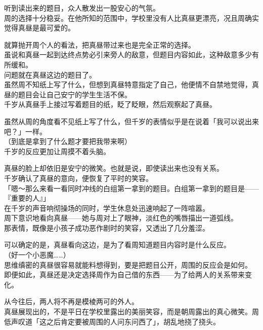 听到读出来的题目，众人散发出一股安心的气氛。\\

周的选择十分稳妥。在他所知的范围中，学校里没有人比真昼更漂亮，况且周确实觉得真昼是最可爱的。

就算抛开周个人的看法，把真昼带过来也是完全正常的选择。\\

虽说和真昼一起到达终点势必引来旁人的敌意，但题目内容如此，这种敌意多少有所缓和。\\

问题就在真昼这边的题目了。\\

虽然周不知纸上写了什么，但想到真昼特意指定了自己，他便情不自禁地觉得，真昼的题目会让自己安宁的学生生活不保。\\

千岁从真昼手上接过写着题目的纸，眨了眨眼，然后观察起了真昼。

虽然从周的角度看不见纸上写了什么，但千岁的表情似乎是在说着「我可以说出来吧？」一样。\\

（到底是拿到了什么题才要把我带来啊）\\

千岁的反应更加让周摸不着头脑。

真昼的脸上却依旧是安宁的微笑。也就是说，即使读出来也没有关系。\\

千岁确认了真昼的意向，便恢复了平时的笑容。\\

「嗯～那么来看一看同时冲线的白组第一拿到的题目。白组第一拿到的题目是——『重要的人』」\\

在千岁的声音响彻操场的同时，学生休息处迅速响起了一阵喧嚣。\\

周下意识地看向真昼——她与周对上了眼神，淡红色的嘴唇描出一道弧线。\\

那表情，既像是小孩子成功恶作剧时的笑容，又透出了几分羞涩。

可以确定的是，真昼看向这边，是为了看周知道题目内容时是什么反应。\\

（好一个小恶魔……）\\

思维缜密的真昼很容易就能料想得到，要是把题目公开，周围的反应会是如何。\\

即便如此，真昼还是决定选择周作为自己借的东西——为了给两人的关系带来变化。

从今往后，两人将不再是模棱两可的外人。\\

真昼展现出的，不是平日在学校里露出的美丽笑容，而是朝周露出的真心微笑。周低声叹道「这之后肯定要被周围的人问东问西了」，胡乱地挠了挠头。
